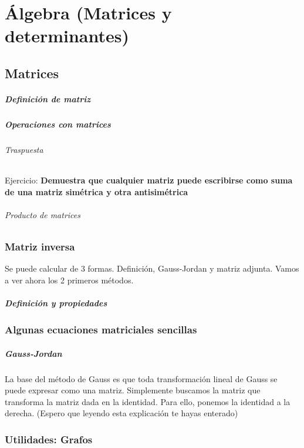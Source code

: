 \chapter{Álgebra (Matrices y determinantes)}

\section{Matrices}

\paragraph{Definición de matriz}

\paragraph{Operaciones con matrices}

\subparagraph{Traspuesta}

Ejercicio: \textbf{Demuestra que cualquier matriz puede escribirse como suma de una matriz simétrica y otra antisimétrica}

\subparagraph{Producto de matrices}

\subsection{Matriz inversa}
Se puede calcular de 3 formas. Definición, Gauss-Jordan y matriz adjunta. Vamos a ver ahora los 2 primeros métodos.

\paragraph{Definición y propiedades}

\subsection{Algunas ecuaciones matriciales sencillas}

\paragraph{Gauss-Jordan}
La base del método de Gauss es que toda transformación lineal de Gauss se puede expresar como una matriz. Simplemente buscamos la matriz que transforma la matriz dada en la identidad. Para ello, ponemos la identidad a la derecha. (Espero que leyendo esta explicación te hayas enterado)


\subsection{Utilidades: Grafos}


